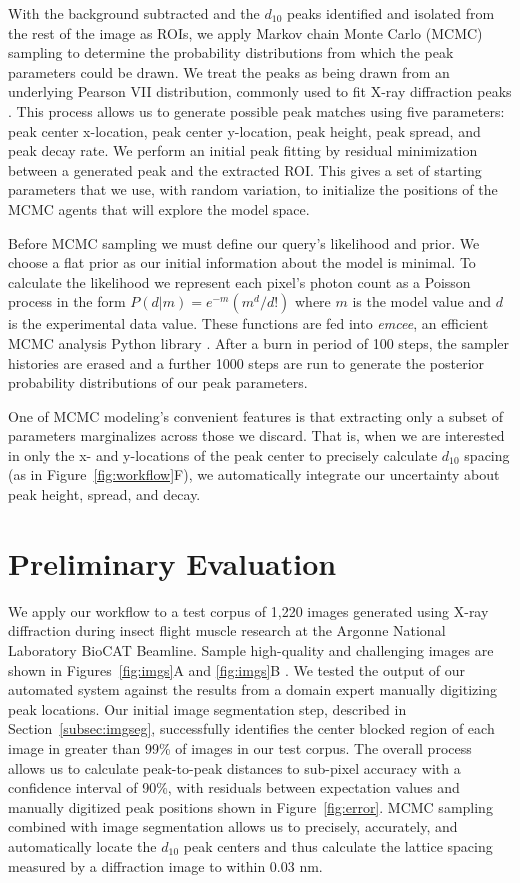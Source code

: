 \documentclass{llncs}
\begin{document}
With the background subtracted and the $d_{10}$ peaks identified and
isolated from the rest of the image as ROIs, we apply Markov chain
Monte Carlo (MCMC) sampling to determine the probability distributions
from which the peak parameters could be drawn. We treat the peaks as
being drawn from an underlying Pearson VII distribution, commonly used
to fit X-ray diffraction peaks \cite{Hall1977}. This process allows us
to generate possible peak matches using five parameters: peak center
x-location, peak center y-location, peak height, peak spread, and peak
decay rate.  We perform an initial peak fitting by residual
minimization between a generated peak and the extracted ROI. This
gives a set of starting parameters that we use, with random variation,
to initialize the positions of the MCMC agents that will explore the
model space. 

Before MCMC sampling we must define our query's likelihood and prior.
We choose a flat prior as our initial information about the model is
minimal. To calculate the likelihood we represent each pixel's photon
count as a Poisson process in the form $P(d|m)=e^{-m}
\left(m^{d}/d!\right)$ where $m$ is the model value and $d$ is the
experimental data value. These functions are fed into \textit{emcee},
an efficient MCMC analysis Python library \cite{ForemanMackey2013}.
After a burn in period of 100 steps, the sampler histories are erased
and a further 1000 steps are run to generate the posterior probability
distributions of our peak parameters. 

One of MCMC modeling's convenient features is that extracting only a
subset of parameters marginalizes across those we discard. That is,
when we are interested in only the x- and y-locations of the peak
center to precisely calculate $d_{10}$ spacing (as in
Figure~\ref{fig:workflow}F), we automatically integrate our uncertainty
about peak height, spread, and decay.


\section{Preliminary Evaluation}
\label{sec:eval}


We apply our workflow to a test corpus of 1,220 images generated using
X-ray diffraction during insect flight muscle research at the Argonne
National Laboratory BioCAT Beamline. Sample high-quality and
challenging images are shown in Figures~\ref{fig:imgs}A and
\ref{fig:imgs}B \cite{Irving2006}. We tested the output of our
automated system against the results from a domain expert manually
digitizing peak locations. Our initial image segmentation step,
described in Section~\ref{subsec:imgseg}, successfully identifies the
center blocked region of each image in greater than 99\% of images in
our test corpus. The overall process allows us to calculate
peak-to-peak distances to sub-pixel accuracy with a confidence
interval of 90\%, with residuals between expectation values and
manually digitized peak positions shown in Figure~\ref{fig:error}.
MCMC sampling combined with image segmentation allows us to precisely,
accurately, and automatically locate the $d_{10}$ peak centers and
thus calculate the lattice spacing measured by a diffraction image to
within 0.03 nm.
\end{document}

